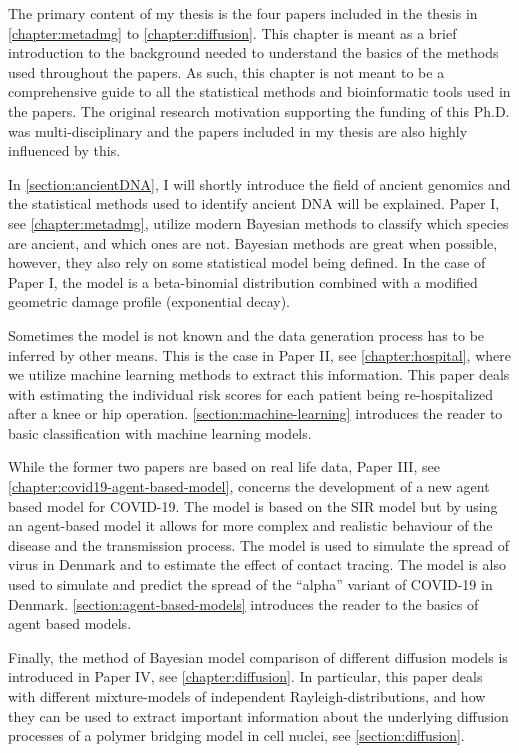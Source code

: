 The primary content of my thesis is the four papers included in the thesis in \autoref{chapter:metadmg} to \autoref{chapter:diffusion}. This chapter is meant as a brief introduction to the background needed to understand the basics of the methods used throughout the papers. As such, this chapter is not meant to be a comprehensive guide to all the statistical methods and bioinformatic tools used in the papers. The original research motivation supporting the funding of this Ph.D. was multi-disciplinary and the papers included in my thesis are also highly influenced by this.

In \autoref{section:ancientDNA}, I will shortly introduce the field of ancient genomics and the statistical methods used to identify ancient DNA will be explained. Paper I, see \autoref{chapter:metadmg}, utilize modern Bayesian methods to classify which species are ancient, and which ones are not. Bayesian methods are great when possible, however, they also rely on some statistical model being defined. In the case of Paper I, the model is a beta-binomial distribution combined with a modified geometric damage profile (exponential decay).

Sometimes the model is not known and the data generation process has to be inferred by other means. This is the case in Paper II, see \autoref{chapter:hospital}, where we utilize machine learning methods to extract this information. This paper deals with estimating the individual risk scores for each patient being re-hospitalized after a knee or hip operation. \autoref{section:machine-learning} introduces the reader to basic classification with machine learning models.

While the former two papers are based on real life data, Paper III, see \autoref{chapter:covid19-agent-based-model}, concerns the development of a new agent based model for COVID-19. The model is based on the SIR model but by using an agent-based model it allows for more complex and realistic behaviour of the disease and the transmission process. The model is used to simulate the spread of virus in Denmark and to estimate the effect of contact tracing. The model is also used to simulate and predict the spread of the ``alpha'' variant of COVID-19 in Denmark. \autoref{section:agent-based-models} introduces the reader to the basics of agent based models.

Finally, the method of Bayesian model comparison of different diffusion models is introduced in Paper IV, see \autoref{chapter:diffusion}. In particular, this paper deals with different mixture-models of independent Rayleigh-distributions, and how they can be used to extract important information about the underlying diffusion processes of a polymer bridging model in cell nuclei, see \autoref{section:diffusion}.

